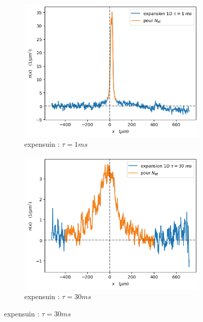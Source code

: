 \documentclass[a3, 10pt,twoside]{article}          %
\theoremstyle{plain}
\theoremstyle{definition}
\theoremstyle{remark}
\theoremstyle{definition} %
\begin{document}
\begin{figure}[ht]
    \vspace{1em}

    \begin{subfigure}[b]{0.3\textwidth}
        \centering
        \includegraphics[width=\textwidth]{Figures/donnees_expansion_1_24-04-2024}
        \caption{expensuin : $\tau = 1ms$}
        \label{fig:sub2}
    \end{subfigure}
	\hfill
    \begin{subfigure}[b]{0.3\textwidth}
        \centering
        \includegraphics[width=\textwidth]{Figures/donnees_expansion_30_24-04-2024}
        \caption{expensuin : $\tau = 30ms$}
        \label{fig:sub3}
    \end{subfigure}

\end{figure}
\end{document}
